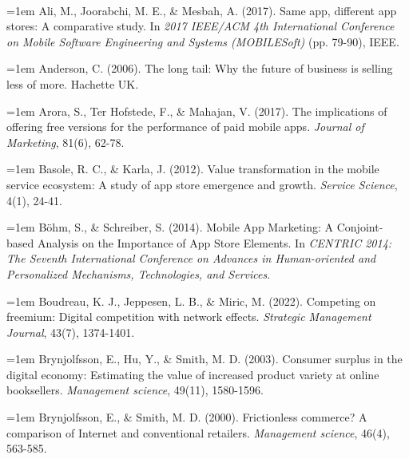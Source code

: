 
%
\begin{center}
\vspace*{2\baselineskip}
{\bf\fontsize{14pt}{14.5pt}\selectfont {Bibliography}}\\\vspace{1cm}
\end{center}

\setlength{\parindent}{0cm}



\hangindent=1em
Ali, M., Joorabchi, M. E., \& Mesbah, A. (2017). Same app, different app stores: A comparative study. In \textit{2017 IEEE/ACM 4th International Conference on Mobile Software Engineering and Systems (MOBILESoft)} (pp. 79-90), IEEE.


\hangindent=1em
Anderson, C. (2006). The long tail: Why the future of business is selling less of more. Hachette UK.


\hangindent=1em
Arora, S., Ter Hofstede, F., \& Mahajan, V. (2017). The implications of offering free versions for the performance of paid mobile apps. \textit{Journal of Marketing}, 81(6), 62-78.

\hangindent=1em
Basole, R. C., \& Karla, J. (2012). Value transformation in the mobile service ecosystem: A study of app store emergence and growth. \textit{Service Science}, 4(1), 24-41.

\hangindent=1em
Böhm, S., \& Schreiber, S. (2014). Mobile App Marketing: A Conjoint-based Analysis on the Importance of App Store Elements. In \textit{CENTRIC 2014: The Seventh International Conference on Advances in Human-oriented and Personalized Mechanisms, Technologies, and Services}.


\hangindent=1em
Boudreau, K. J., Jeppesen, L. B., \& Miric, M. (2022). Competing on freemium: Digital competition with network effects. \textit{Strategic Management Journal}, 43(7), 1374-1401.

\hangindent=1em
Brynjolfsson, E., Hu, Y., \& Smith, M. D. (2003). Consumer surplus in the digital economy: Estimating the value of increased product variety at online booksellers. \textit{Management science}, 49(11), 1580-1596.

\hangindent=1em
Brynjolfsson, E., \& Smith, M. D. (2000). Frictionless commerce? A comparison of Internet and conventional retailers. \textit{Management science}, 46(4), 563-585.

